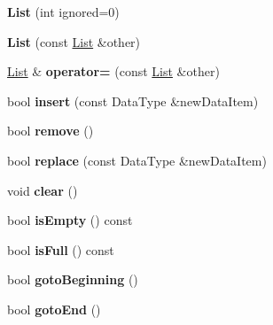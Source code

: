 \begin{DoxyCompactItemize}
\item 
\hypertarget{class_list_a29ebd92241d28ac3a50648718e37e032}{{\bfseries \-List} (int ignored=0)}\label{class_list_a29ebd92241d28ac3a50648718e37e032}

\item 
\hypertarget{class_list_afeddbd8f22c5da2781451721b792dcf5}{{\bfseries \-List} (const \hyperlink{class_list}{\-List} \&other)}\label{class_list_afeddbd8f22c5da2781451721b792dcf5}

\item 
\hypertarget{class_list_a49038dc1f08e371431dae6721e01057a}{\hyperlink{class_list}{\-List} \& {\bfseries operator=} (const \hyperlink{class_list}{\-List} \&other)}\label{class_list_a49038dc1f08e371431dae6721e01057a}

\item 
\hypertarget{class_list_a087be605248b18b3e2e760bc08c87a87}{bool {\bfseries insert} (const \-Data\-Type \&new\-Data\-Item)}\label{class_list_a087be605248b18b3e2e760bc08c87a87}

\item 
\hypertarget{class_list_abd0ed7b5f10baa34a7192417a243f389}{bool {\bfseries remove} ()}\label{class_list_abd0ed7b5f10baa34a7192417a243f389}

\item 
\hypertarget{class_list_a7e054d3c447994841ad1a00dedd0529c}{bool {\bfseries replace} (const \-Data\-Type \&new\-Data\-Item)}\label{class_list_a7e054d3c447994841ad1a00dedd0529c}

\item 
\hypertarget{class_list_ac7caeeb79393c56da1236ee5fdcb6342}{void {\bfseries clear} ()}\label{class_list_ac7caeeb79393c56da1236ee5fdcb6342}

\item 
\hypertarget{class_list_a96ee4b396dec9c6b9d7d6a88d27d4e7e}{bool {\bfseries is\-Empty} () const }\label{class_list_a96ee4b396dec9c6b9d7d6a88d27d4e7e}

\item 
\hypertarget{class_list_a30ac234160a2a83eb4a0a12946923707}{bool {\bfseries is\-Full} () const }\label{class_list_a30ac234160a2a83eb4a0a12946923707}

\item 
\hypertarget{class_list_af0dff079ec1203be2bda2a5242347148}{bool {\bfseries goto\-Beginning} ()}\label{class_list_af0dff079ec1203be2bda2a5242347148}

\item 
\hypertarget{class_list_ac76fd97475353ceabb6fcb1ddd011b68}{bool {\bfseries goto\-End} ()}\label{class_list_ac76fd97475353ceabb6fcb1ddd011b68}


\end{DoxyCompactItemize}
